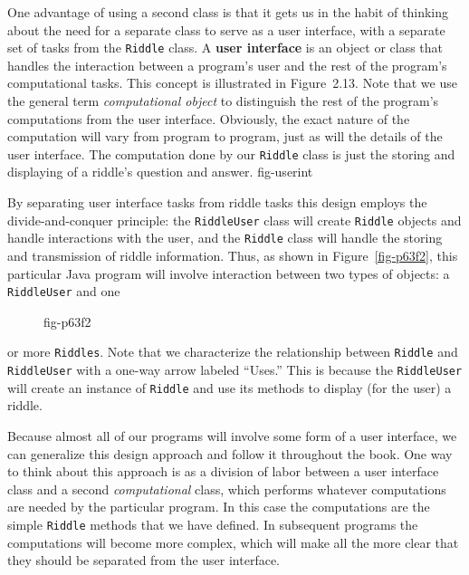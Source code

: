One advantage of using a second class is that it gets us in the
habit of thinking about the need for a separate class to serve as a
user interface, with a separate set of tasks from the {\tt Riddle}
class. A {\bf user interface} is an object or class that handles the
interaction between a program's user and the rest of the program's
computational tasks. This concept is illustrated in Figure~2.13. Note
that we use the general term {\it computational object} to distinguish
the rest of the program's computations from the user interface.
Obviously, the exact nature of the computation will vary from program
to program, just as will the details of the user interface.  The
computation done by our {\tt Riddle} class is just the storing and
displaying of a riddle's question and answer.
{fig-userint}


By separating user interface tasks from riddle tasks this design
employs the divide-and-conquer principle: the {\tt RiddleUser} class
will create {\tt Riddle} objects and handle interactions with the
user, and the {\tt Riddle} class will handle the storing and
transmission of riddle information.  Thus, as shown in
Figure~\ref{fig-p63f2}, this particular Java program will involve
interaction between two types of objects: a {\tt RiddleUser} and one
\begin{figure}[h!]
\figaleft{chptr02/riddleuser.eps}{This UML class diagram represents an {\em association}
between the {\tt RiddleUser} and {\tt Riddle} classes.  The {\tt
Riddle\-User} class will {\em use} one or more objects of the {\tt
Riddle} class.
} {fig-p63f2}

\end{figure}
or more {\tt Riddles}. Note that we characterize the relationship
between {\tt Riddle} and {\tt RiddleUser} with a one-way arrow labeled
``Uses.''  This is because the {\tt RiddleUser} will create an
instance of {\tt Riddle} and use its methods to display (for the user)
a riddle.

Because almost all of our programs will involve some form of a user
interface, we can generalize this design approach and follow it
throughout the book. One way to think about this approach is as a
division of labor between a user interface class and a second {\em
computational} class, which performs whatever computations are needed
by the particular program. In this case the computations are the simple
{\tt Riddle} methods that we have defined. In subsequent programs the
computations will become more complex, which will make all the more
clear that they should be separated from the user interface.
 

